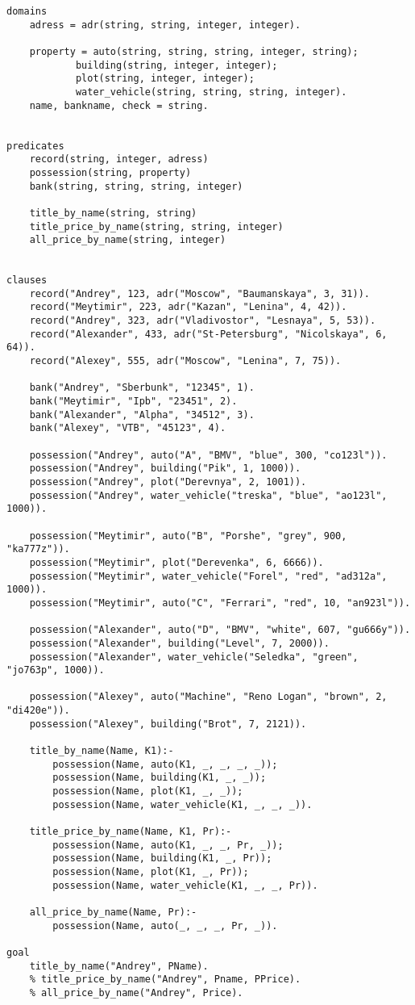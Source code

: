 \begin{lstlisting}
domains
	adress = adr(string, string, integer, integer).
	
	property = auto(string, string, string, integer, string);
			building(string, integer, integer);
			plot(string, integer, integer);
			water_vehicle(string, string, string, integer).
	name, bankname, check = string.

	
predicates
	record(string, integer, adress)
	possession(string, property)
	bank(string, string, string, integer)

	title_by_name(string, string)
	title_price_by_name(string, string, integer)
	all_price_by_name(string, integer)


clauses
	record("Andrey", 123, adr("Moscow", "Baumanskaya", 3, 31)).
	record("Meytimir", 223, adr("Kazan", "Lenina", 4, 42)).
	record("Andrey", 323, adr("Vladivostor", "Lesnaya", 5, 53)).
	record("Alexander", 433, adr("St-Petersburg", "Nicolskaya", 6, 64)).
	record("Alexey", 555, adr("Moscow", "Lenina", 7, 75)).

	bank("Andrey", "Sberbunk", "12345", 1).
	bank("Meytimir", "Ipb", "23451", 2).
	bank("Alexander", "Alpha", "34512", 3).
	bank("Alexey", "VTB", "45123", 4).

	possession("Andrey", auto("A", "BMV", "blue", 300, "co123l")).
	possession("Andrey", building("Pik", 1, 1000)).
	possession("Andrey", plot("Derevnya", 2, 1001)).
	possession("Andrey", water_vehicle("treska", "blue", "ao123l", 1000)).	

	possession("Meytimir", auto("B", "Porshe", "grey", 900, "ka777z")).
	possession("Meytimir", plot("Derevenka", 6, 6666)).
	possession("Meytimir", water_vehicle("Forel", "red", "ad312a", 1000)).
	possession("Meytimir", auto("C", "Ferrari", "red", 10, "an923l")).
	
	possession("Alexander", auto("D", "BMV", "white", 607, "gu666y")).
	possession("Alexander", building("Level", 7, 2000)).
	possession("Alexander", water_vehicle("Seledka", "green", "jo763p", 1000)).

	possession("Alexey", auto("Machine", "Reno Logan", "brown", 2, "di420e")).
	possession("Alexey", building("Brot", 7, 2121)).
	
	title_by_name(Name, K1):-
		possession(Name, auto(K1, _, _, _, _));
		possession(Name, building(K1, _, _));
		possession(Name, plot(K1, _, _));
		possession(Name, water_vehicle(K1, _, _, _)).
	
	title_price_by_name(Name, K1, Pr):-
		possession(Name, auto(K1, _, _, Pr, _));
		possession(Name, building(K1, _, Pr));
		possession(Name, plot(K1, _, Pr));
		possession(Name, water_vehicle(K1, _, _, Pr)).
	
	all_price_by_name(Name, Pr):-
		possession(Name, auto(_, _, _, Pr, _)).

goal
	title_by_name("Andrey", PName).
	% title_price_by_name("Andrey", Pname, PPrice).
	% all_price_by_name("Andrey", Price).
\end{lstlisting}
